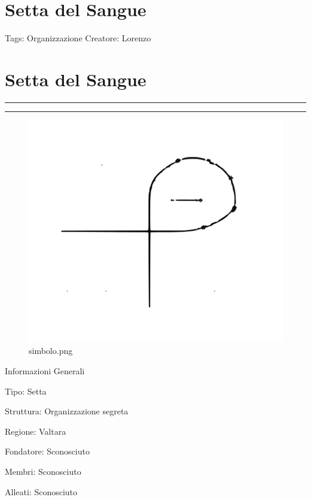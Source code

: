 \section{Setta del Sangue}\label{setta-del-sangue}

Tags: Organizzazione Creatore: Lorenzo

\section{Setta del Sangue}\label{setta-del-sangue-1}

\begin{center}\rule{0.5\linewidth}{0.5pt}\end{center}

\begin{center}\rule{0.5\linewidth}{0.5pt}\end{center}

\begin{figure}
\centering
\includegraphics{simbolo.png}
\caption{simbolo.png}
\end{figure}

Informazioni Generali

Tipo: Setta

Struttura: Organizzazione segreta

Regione: Valtara

Fondatore: Sconosciuto

Membri: Sconosciuto

Alleati: Sconosciuto

